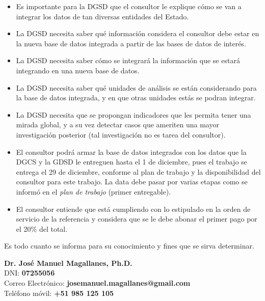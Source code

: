 \documentclass[a4paper,12pt]{texMemo}
\begin{document}
\begin{itemize}

\item Es importante para la DGSD que el consultor le explique cómo se van a integrar los datos de tan diversas entidades del Estado.
\item La DGSD necesita saber qué información considera el consultor debe estar en la nueva base de datos integrada a partir de las bases de datos de interés.
\item La DGSD necesita saber cómo se integrará la información que se estará integrando en una nueva base de datos.
\item La DGSD necesita saber qué unidades de análisis se están considerando para la base de datos integrada, y en que otras unidades estás se podran integrar.
\item La DGSD necesita que se propongan indicadores que les permita tener una mirada global, y a su vez detectar casos que ameriten una mayor investigación posterior (tal investigación no es tarea del consultor).
\item El consultor podrá armar la base de datos integrados con los datos que la DGCS y la GDSD le entreguen hasta el 1 de diciembre, pues el trabajo se entrega el 29 de diciembre, conforme al plan de trabajo y la disponibilidad del consultor para este trabajo. La data debe pasar por varias etapas como se informó en el \emph{plan de trabajo} (primer entregable).
\item El consultor entiende que está cumpliendo con lo estipulado en la orden de servicio de la referencia y considera que se le debe abonar el primer pago por el 20\% del total.

\end{itemize}


Es todo cuanto se informa para su conocimiento y fines que se sirva determinar.




\vspace{75px}
\noindent
{\bf Dr. José Manuel Magallanes, Ph.D.}\\
DNI: {\bf 07255056}\\
Correo Electrónico: {\bf josemanuel.magallanes@gmail.com}\\
Teléfono móvil: {\bf +51 985 125 105}


\end{document}

